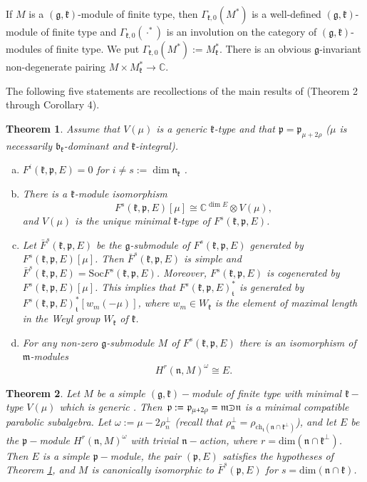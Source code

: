 \documentclass[10pt]{amsart}
\newtheorem{theo}{Theorem}[section]
\newcommand{\Soc}{\mathrm{Soc}}
\newcommand{\field}[1]{\mathbb{#1}}
\newcommand{\bb}{\mathfrak{b}}
\renewcommand{\gg}{\mathfrak{g}}
\newcommand{\kk}{\mathfrak{k}}
\newcommand{\mm}{\mathfrak{m}}
\newcommand{\nn}{\mathfrak{n}}
\newcommand{\pp}{\mathfrak{p}}
\renewcommand{\tt}{\mathfrak{t}}
\def\crplus{\hbox{$\supset${\raise1.05pt\hbox{\kern -0.55em ${\scriptscriptstyle +}$}}\ }}
\begin{document}
If $M$ is a $(\gg,\kk)$-module of finite type, then $\Gamma_{\kk,0}(M^*)$ is a well-defined $(\gg,\kk)$-module of finite type and $\Gamma_{\kk,0}(\cdot^*)$ is an involution on the category of $(\gg,\kk)$-modules of finite type. We put $\Gamma_{\kk,0}(M^*):=M_\kk^*$. There is an obvious $\gg$-invariant non-degenerate pairing $M\times M_\kk^*\rightarrow\field{C}$.

\vspace{0.5cm}

The following five statements are recollections of the main results of \cite{PZ2} (Theorem 2 through Corollary 4).

\begin{theo}\label{th:4}
    Assume that $V(\mu)$ is a generic $\kk$-type and that $\pp=\pp_{\mu+2\rho}$ ($\mu$ is necessarily $\bb_\kk$-dominant and $\kk$-integral).
	\begin{enumerate}[a)]
	\item $F^i(\kk,\pp,E)=0$ for $i\neq s:=\dim\nn_\kk$ .
	\item There is a $\kk$-module isomorphism $$F^s(\kk,\pp,E)[\mu]\cong\field{C}^{\dim E}\otimes V(\mu),$$ and $V(\mu)$ is the unique minimal $\kk$-type of $F^s(\kk,\pp,E)$.
	\item Let $\bar{F}^s(\kk,\pp,E)$ be the $\gg$-submodule of $F^s(\kk,\pp,E)$ generated by $F^s(\kk,\pp,E)[\mu]$. Then $\bar{F}^s(\kk,\pp,E)$ is simple and $\bar{F}^s(\kk,\pp,E) = \Soc F^s(\kk,\pp,E)$. Moreover, $F^s(\kk,\pp,E)$ is cogenerated by $F^s(\kk,\pp,E)[\mu]$. This implies that $F^s(\kk,\pp,E)^*_\tt$ is generated by $F^s(\kk,\pp,E)^*_\tt[w_m(-\mu)]$, where $w_m\in W_\kk$  is the element of maximal length in the Weyl group $W_\kk$ of $\kk$.
	\item For any non-zero $\gg$-submodule $M$ of $F^s(\kk,\pp,E)$ there is an isomorphism of $\mm$-modules $$H^r(\nn,M)^\omega\cong E.$$
\end{enumerate}
\end{theo}

\begin{theo}\label{recth1}
 Let $M$ be a simple $(\gg,\kk)-$module of finite type with minimal $\kk-$type $V(\mu)$ which is generic . Then $\pp:=\pp_{\mu+2\rho} = \mm \crplus \nn$ is a minimal compatible parabolic subalgebra. Let $\omega:=\mu - 2\rho^{\perp}_n$ (recall that $\rho^{\perp}_\nn = \rho_{\mathrm{ch}_\tt(\nn \cap \kk^{\perp})}$), and let $E$ be the $\pp-$module $H^r(\nn,M)^{\omega}$ with trivial $\nn-$action, where $r = \mathrm{dim}(\nn\cap\kk^{\perp})$. Then $E$ is a simple $\pp-$module, the pair $(\pp,E)$ satisfies the hypotheses of Theorem \ref{th:4}, and $M$ is canonically isomorphic to $\bar{F}^s(\pp,E)$ for $s=\mathrm{dim}(\nn\cap\kk)$.
\end{theo}
\end{document}
